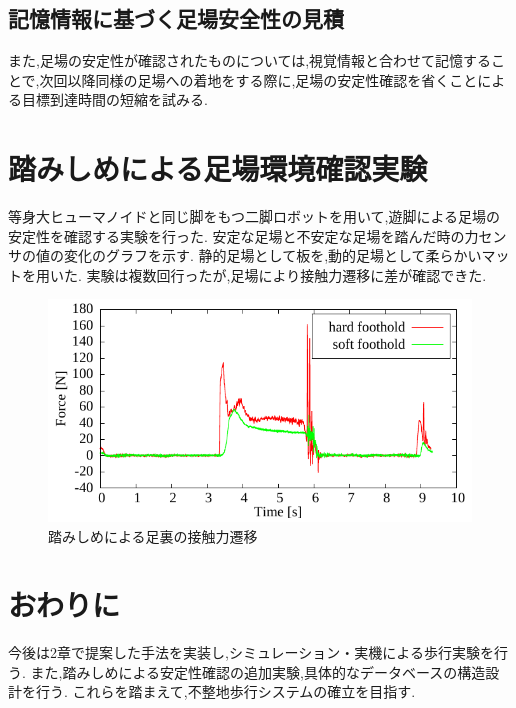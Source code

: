 \documentclass[twocolumn]{preport}
\begin{document}
\subsection{記憶情報に基づく足場安全性の見積}
また,足場の安定性が確認されたものについては,視覚情報と合わせて記憶することで,次回以降同様の足場への着地をする際に,足場の安定性確認を省くことによる目標到達時間の短縮を試みる.


\section{踏みしめによる足場環境確認実験}
等身大ヒューマノイドと同じ脚をもつ二脚ロボットを用いて,遊脚による足場の安定性を確認する実験を行った.
安定な足場と不安定な足場を踏んだ時の力センサの値の変化のグラフを示す.
静的足場として板を,動的足場として柔らかいマットを用いた.
実験は複数回行ったが,足場により接触力遷移に差が確認できた.

\begin{figure}[tbh]
 \begin{center}
   \centering
   \includegraphics[width=0.8\columnwidth]{exp_foothold_check.pdf}
   \caption{踏みしめによる足裏の接触力遷移}
   \label{figure:exp}
 \end{center}
\end{figure}



\section{おわりに}

今後は2章で提案した手法を実装し,シミュレーション・実機による歩行実験を行う.
また,踏みしめによる安定性確認の追加実験,具体的なデータベースの構造設計を行う.
これらを踏まえて,不整地歩行システムの確立を目指す.



\small


\end{document}

